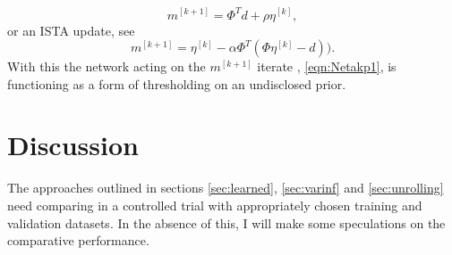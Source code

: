 \documentclass[12pt]{article}
\begin{document}
\begin{equation}
m^{[k+1]}=\Phi^T d+\rho \eta^{[k]},
\end{equation}
or an ISTA update, see \cite{lista}
\begin{equation}
m^{[k+1]}=\eta^{[k]}-\alpha\Phi^T(\Phi\eta^{[k]}-d)).
\end{equation}
With this the network acting on the $m^{[k+1]}$ iterate , \ref{eqn:Netakp1}, is functioning as a form of thresholding on an undisclosed prior.

\section{Discussion}\label{sec:discuss}
The approaches outlined in sections \ref{sec:learned}, \ref{sec:varinf} and \ref{sec:unrolling} need comparing in a controlled trial with appropriately chosen training and validation datasets. In the absence of this, I will make some speculations on the comparative performance.
\end{document}
